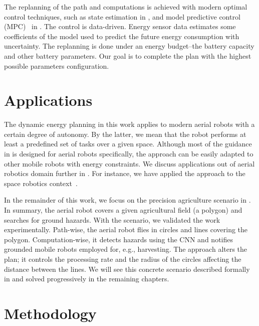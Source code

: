 The replanning of the path and computations is achieved with modern optimal control techniques, such as state estimation in , and  model predictive control (MPC)~\citep{rawlings2017model} in . The control is data-driven. Energy sensor data estimates some coefficients of the model used to predict the future energy consumption with uncertainty. The replanning is done under an energy budget--the battery capacity and other battery parameters. Our goal is to complete the plan with the highest possible parameters configuration. 


\section{Applications}

The dynamic energy planning in this work applies to modern aerial robots with a certain degree of autonomy. By the latter, we mean that the robot performs at least a predefined set of tasks over a given space. Although most of the guidance in  is designed for aerial robots specifically, the approach can be easily adapted to other mobile robots with energy constraints. We discuss applications out of aerial robotics domain further in . For instance, we have applied the approach to the space robotics context~\citep{seewald2020beyond}. 

In the remainder of this work, we focus on the precision agriculture scenario in . In summary, the aerial robot covers a given agricultural field (a polygon) and searches for ground hazards. With the scenario, we validated the work experimentally. Path-wise, the aerial robot flies in circles and lines covering the polygon. Computation-wise, it detects hazards using the CNN and notifies grounded mobile robots employed for, e.g., harvesting. The approach alters the plan; it controls the processing rate and the radius of the circles affecting the distance between the lines. We will see this concrete scenario described formally in  and solved progressively in the remaining chapters.



\section{\color{red}Methodology}


